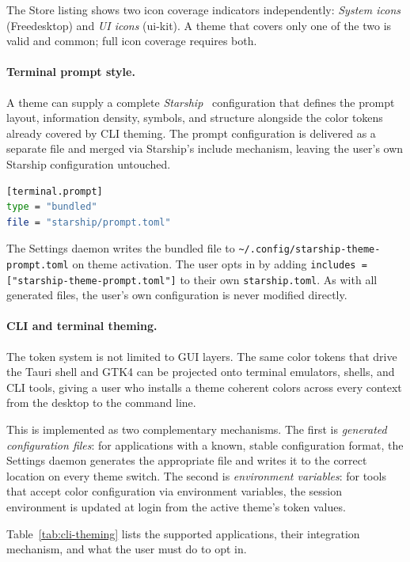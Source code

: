 The Store listing shows two icon coverage indicators independently:
\emph{System icons} (Freedesktop) and \emph{UI icons} (ui-kit). A theme that
covers only one of the two is valid and common; full icon coverage requires
both.

\paragraph{Terminal prompt style.}
A theme can supply a complete \emph{Starship}~\cite{starship} configuration
that defines the prompt layout, information density, symbols, and structure
alongside the color tokens already covered by CLI theming. The prompt
configuration is delivered as a separate file and merged via Starship's
include mechanism, leaving the user's own Starship configuration untouched.

\begin{lstlisting}[language=bash, caption={Terminal prompt style declaration}]
[terminal.prompt]
type = "bundled"
file = "starship/prompt.toml"
\end{lstlisting}

The Settings daemon writes the bundled file to
\texttt{\textasciitilde/.config/starship-theme-prompt.toml} on theme
activation. The user opts in by adding
\texttt{includes = ["starship-theme-prompt.toml"]} to their own
\texttt{starship.toml}. As with all generated files, the user's own
configuration is never modified directly.

\paragraph{CLI and terminal theming.}
The token system is not limited to GUI layers. The same color tokens that drive
the Tauri shell and GTK4 can be projected onto terminal emulators, shells, and
CLI tools, giving a user who installs a theme coherent colors across every
context from the desktop to the command line.

This is implemented as two complementary mechanisms. The first is
\emph{generated configuration files}: for applications with a known,
stable configuration format, the Settings daemon generates the appropriate
file and writes it to the correct location on every theme switch. The second
is \emph{environment variables}: for tools that accept color configuration
via environment variables, the session environment is updated at login from
the active theme's token values.

Table~\ref{tab:cli-theming} lists the supported applications, their
integration mechanism, and what the user must do to opt in.


